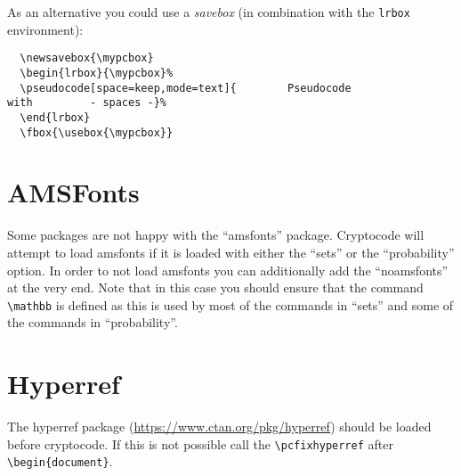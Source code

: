 \documentclass[a4paper]{report}
\begin{document}
  As an alternative you could use a \emph{savebox} (in combination with the \lstinline$lrbox$ environment):
   
  \newsavebox{\mypcbox}
  \begin{lrbox}{\mypcbox}%
  \end{lrbox}
  \fbox{\usebox{\mypcbox}}
  
  \begin{lstlisting}
  \newsavebox{\mypcbox}
  \begin{lrbox}{\mypcbox}%
  \pseudocode[space=keep,mode=text]{        Pseudocode                with         - spaces -}%
  \end{lrbox}
  \fbox{\usebox{\mypcbox}}
  \end{lstlisting}
  
  \section{AMSFonts}
  Some packages are not happy with the \enquote{amsfonts} package. Cryptocode will attempt to load amsfonts if it is loaded
  with either the \enquote{sets} or the \enquote{probability} option. In order to not load amsfonts you can additionally add the
  \enquote{noamsfonts} at the very end. Note that in this case you should ensure that the command \lstinline$\mathbb$ is defined
  as this is used by most of the commands in \enquote{sets} and some of the commands in \enquote{probability}.
  
  \section{Hyperref}
  The hyperref package (\url{https://www.ctan.org/pkg/hyperref}) should be loaded before cryptocode. If this is not possible
  call the \lstinline$\pcfixhyperref$ after \lstinline$\begin{document}$. 
  
  \printindex
  
  
  
  
\end{document}
